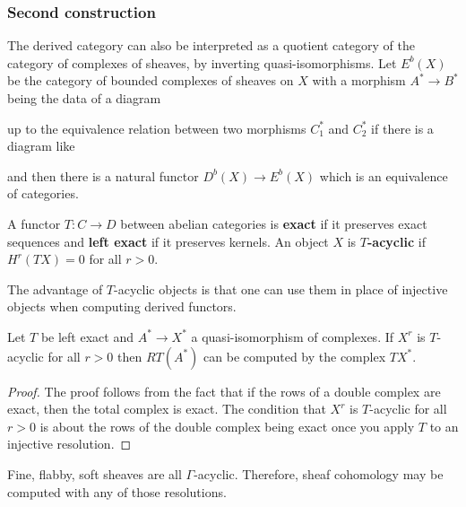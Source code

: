 \begin{corollary}
\subsubsection{Second construction}
The derived category can also be interpreted as a quotient 
category of the category of complexes of sheaves, by inverting
quasi-isomorphisms. Let $E^b(X)$ be the category of bounded
complexes of sheaves on $X$ with a morphism $A^*\to B^*$ being the data of a diagram \begin{center}
\end{center} up to the equivalence relation between two morphisms $C^*_1$ and $C^*_2$ if there is 
a diagram like \begin{center}
\end{center}
and then there is a natural functor $D^b(X) \to E^b(X)$ which is an equivalence of categories. 

\begin{definition}
    A functor $T:C\to D$ between abelian categories is \textbf{exact}
    if it preserves exact sequences and \textbf{left exact} if it
    preserves kernels. An object $X$ is \textbf{$T$-acyclic} if $H^r(TX) = 0$
    for all $r>0$.
\end{definition}
The advantage of $T$-acyclic objects is that one can use them in place of injective objects
when computing derived functors. 

\begin{lemma}
    Let $T$ be left exact and $A^* \to X^*$ a quasi-isomorphism of complexes. 
    If $X^r$ is $T$-acyclic for all $r>0$ then $RT(A^*)$ can be computed by
    the complex $TX^*$.
\end{lemma}

\begin{proof}
    The proof follows from the fact that if the rows of a double complex are exact, then 
    the total complex is exact. The condition that $X^r$ is $T$-acyclic for all $r>0$ is about
    the rows of the double complex being exact once you apply $T$ to an injective resolution.
\end{proof}
\begin{remark}
    Fine, flabby, soft sheaves are all $\Gamma$-acyclic. Therefore, 
    sheaf cohomology may be computed with any of those resolutions.
\end{remark}
\end{corollary}


